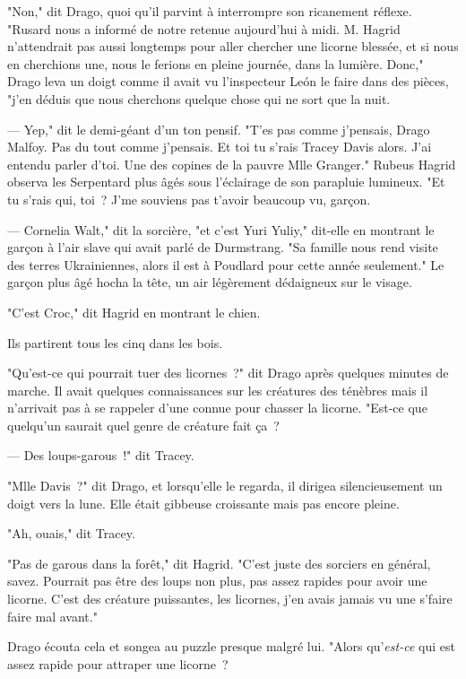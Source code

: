 "Non," dit Drago, quoi qu'il parvint à interrompre son ricanement réflexe. "Rusard nous a informé de notre retenue aujourd'hui à midi. M. Hagrid n'attendrait pas aussi longtemps pour aller chercher une licorne blessée, et si nous en cherchions une, nous le ferions en pleine journée, dans la lumière. Donc," Drago leva un doigt comme il avait vu l'inspecteur León le faire dans des pièces, "j'en déduis que nous cherchons quelque chose qui ne sort que la nuit.

--- Yep," dit le demi-géant d'un ton pensif. "T'es pas comme j'pensais, Drago Malfoy. Pas du tout comme j'pensais. Et toi tu s'rais Tracey Davis alors. J'ai entendu parler d'toi. Une des copines de la pauvre Mlle Granger." Rubeus Hagrid observa les Serpentard plus âgés sous l'éclairage de son parapluie lumineux. "Et tu s'rais qui, toi~? J'me souviens pas t'avoir beaucoup vu, garçon.

--- Cornelia Walt," dit la sorcière, "et c'est Yuri Yuliy," dit-elle en montrant le garçon à l'air slave qui avait parlé de Durmstrang. "Sa famille nous rend visite des terres Ukrainiennes, alors il est à Poudlard pour cette année seulement." Le garçon plus âgé hocha la tête, un air légèrement dédaigneux sur le visage.

"C'est Croc," dit Hagrid en montrant le chien.

Ils partirent tous les cinq dans les bois.

"Qu'est-ce qui pourrait tuer des licornes~?" dit Drago après quelques minutes de marche. Il avait quelques connaissances sur les créatures des ténèbres mais il n'arrivait pas à se rappeler d'une connue pour chasser la licorne. "Est-ce que quelqu'un saurait quel genre de créature fait ça~?

--- Des loups-garous~!" dit Tracey.

"Mlle Davis~?" dit Drago, et lorsqu'elle le regarda, il dirigea silencieusement un doigt vers la lune. Elle était gibbeuse croissante mais pas encore pleine.

"Ah, ouais," dit Tracey.

"Pas de garous dans la forêt," dit Hagrid. "C'est juste des sorciers en général, savez. Pourrait pas être des loups non plus, pas assez rapides pour avoir une licorne. C'est des créature puissantes, les licornes, j'en avais jamais vu une s'faire faire mal avant."

Drago écouta cela et songea au puzzle presque malgré lui. "Alors qu'\emph{est-ce} qui est assez rapide pour attraper une licorne~?

